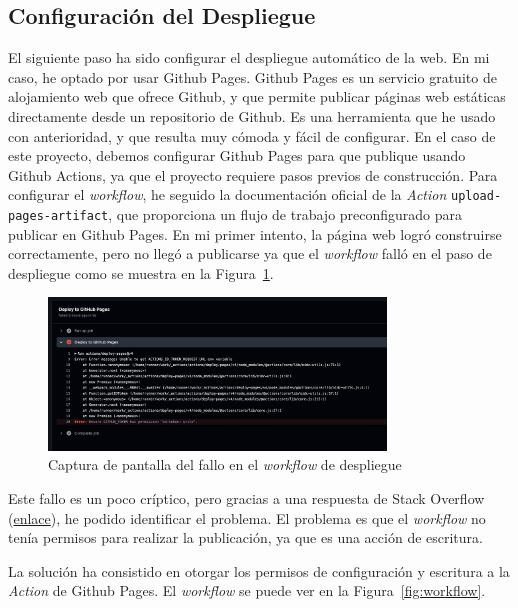 \documentclass{article}
\begin{document}
\subsection{Configuración del Despliegue}\label{subsec:configuracion-del-despliegue}

El siguiente paso ha sido configurar el despliegue automático de la web.
En mi caso, he optado por usar Github Pages.
Github Pages es un servicio gratuito de alojamiento web que ofrece Github, y que permite publicar páginas web estáticas directamente desde un repositorio de Github.
Es una herramienta que he usado con anterioridad, y que resulta muy cómoda y fácil de configurar.
En el caso de este proyecto, debemos configurar Github Pages para que publique usando Github Actions, ya que el proyecto requiere pasos previos de construcción.
Para configurar el \textit{workflow}, he seguido la documentación oficial de la \textit{Action} \lstinline|upload-pages-artifact|, que proporciona un flujo de trabajo preconfigurado para publicar en Github Pages.
En mi primer intento, la página web logró construirse correctamente, pero no llegó a publicarse ya que el \textit{workflow} falló en el paso de despliegue como se muestra en la Figura~\ref{fig:workflow-fail}.

\begin{figure}[h!]
    \centering
    \includegraphics[width=0.8\textwidth]{./img/workflow-failed}
    \caption{Captura de pantalla del fallo en el \textit{workflow} de despliegue}
    \label{fig:workflow-fail}
\end{figure}

Este fallo es un poco críptico, pero gracias a una respuesta de Stack Overflow (\href{https://stackoverflow.com/a/74167257}{enlace}), he podido identificar el problema.
El problema es que el \textit{workflow} no tenía permisos para realizar la publicación, ya que es una acción de escritura.

La solución ha consistido en otorgar los permisos de configuración y escritura a la \textit{Action} de Github Pages.
El \textit{workflow} se puede ver en la Figura~\ref{fig:workflow}.
\end{document}
